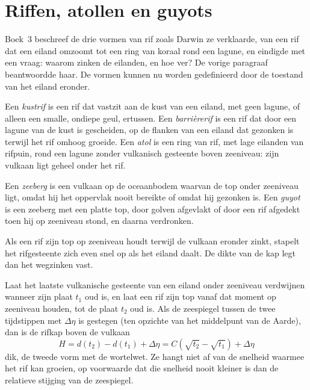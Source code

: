 \section{Riffen, atollen en guyots}\label{sec:b2:oceanic-islands:reefs}

Boek~3 beschreef de drie vormen van rif zoals Darwin ze verklaarde, van een rif dat
een eiland omzoomt tot een ring van koraal rond een lagune, en eindigde met een vraag: waarom zinken de eilanden,
en hoe ver? De vorige paragraaf beantwoordde haar. De vormen kunnen nu worden gedefinieerd door de toestand van het
eiland eronder.

\begin{definition}\label{def:b2:oceanic-islands:reefs}
Een \emph{kustrif} is een rif dat vastzit aan de kust van een eiland, met geen
lagune, of alleen een smalle, ondiepe geul, ertussen. Een \emph{barrièrerif}
is een rif dat door een lagune van de kust is gescheiden, op de flanken van een eiland dat gezonken is terwijl het
rif omhoog groeide. Een \emph{atol} is een ring van rif, met lage eilanden van rifpuin,
rond een lagune zonder vulkanisch gesteente boven zeeniveau: zijn vulkaan ligt geheel onder het rif.
\end{definition}

\begin{definition}\label{def:b2:oceanic-islands:seamount}
Een \emph{zeeberg} is een vulkaan op de oceaanbodem waarvan de top onder
zeeniveau ligt, omdat hij het oppervlak nooit bereikte of omdat hij gezonken is. Een
\emph{guyot} is een zeeberg met een platte top, door golven afgevlakt of door een rif afgedekt toen
hij op zeeniveau stond, en daarna verdronken.
\end{definition}

Als een rif zijn top op zeeniveau houdt terwijl de vulkaan eronder zinkt, stapelt het rifgesteente zich even
snel op als het eiland daalt. De dikte van de kap legt dan het wegzinken vast.

\begin{proposition}\label{prop:b2:oceanic-islands:cap}
Laat het laatste vulkanische gesteente van een eiland onder zeeniveau verdwijnen wanneer zijn plaat $t_1$ oud is, en laat een
rif zijn top vanaf dat moment op zeeniveau houden, tot de plaat $t_2$ oud is. Als de zeespiegel tussen de twee tijdstippen
met $\Delta\eta$ is gestegen (ten opzichte van het middelpunt van de Aarde), dan is de rifkap
boven de vulkaan
\[
H = d(t_2) - d(t_1) + \Delta\eta = C\left(\sqrt{t_2} - \sqrt{t_1}\right) + \Delta\eta
\]
dik, de tweede vorm met de wortelwet. Ze hangt niet af van de snelheid waarmee het rif kan
groeien, op voorwaarde dat die snelheid nooit kleiner is dan de relatieve stijging van de zeespiegel.
\end{proposition}

